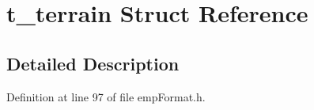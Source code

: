 \hypertarget{structt__terrain}{}\section{t\+\_\+terrain Struct Reference}
\label{structt__terrain}


\subsection{Detailed Description}


Definition at line 97 of file emp\+Format.\+h.

